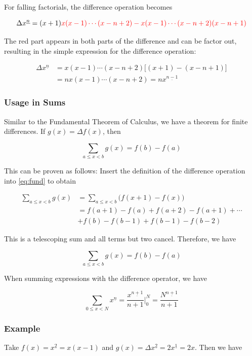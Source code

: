 For falling factorials, the difference operation becomes

\[
\Delta x^{\underline{n}} = (x+1) \color{red}{ x(x-1)\cdots(x-n+2)} - \color{red}{x(x-1)\cdots(x-n+2)} (x-n+1)
\]

The red part appears in both parts of the difference and can be factor out, resulting in the simple expression for the difference operation:

\begin{align*}
\Delta x^{\underline{n}} &= x(x-1)\cdots(x-n+2) \big[ (x+1) - (x-n+1) \big] \\
&= n x(x-1)\cdots(x-n+2) = n x^{\underline{n-1}}
\end{align*}


\subsubsection{Usage in Sums}

Similar to the Fundamental Theorem of Calculus, we have a theorem for finite differences. If $g(x) = \Delta f(x)$, then

\begin{equation}
\label{eq:fund}
\sum_{a \leq x < b} g(x) = f(b) - f(a)
\end{equation}

This can be proven as follows: Insert the definition of the difference operation into \eqref{eq:fund} to obtain

\begin{align*}
\sum_{a \leq x < b} g(x) &= \sum_{a \leq x < b} \big( f(x+1) - f(x) \big) \\
&= f(a+1) - f(a) + f(a+2) - f(a+1) + \cdots \\ 
& + f(b) - f(b-1) + f(b-1) - f(b-2)
\end{align*}

This is a telescoping sum and all terms but two cancel. Therefore, we have

\[
\sum_{a \leq x < b} g(x) = f(b) - f(a)
\]

When summing expressions with the difference operator, we have

\[
\sum_{0 \leq x < N} x^{\underline{n}} = \frac{x^{\underline{n+1}}}{n+1} \bigg|_0^N = \frac{N^{\underline{n+1}}}{n+1}
\]

\subsubsection{Example}

Take $f(x) = x^{\underline{2}}=x(x-1)$ and $g(x) = \Delta x^{\underline{2}} = 2 x^{\underline{1}} = 2x$. Then we have

